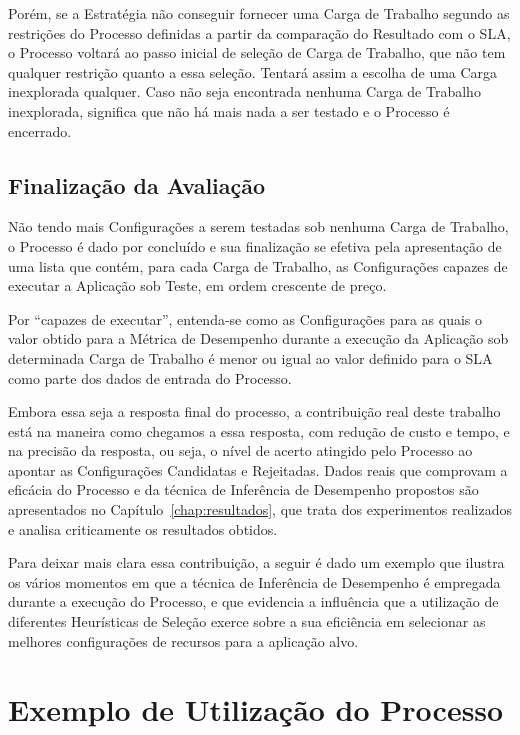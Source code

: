 Porém, se a Estratégia não conseguir fornecer uma Carga de Trabalho segundo as 
restrições do Processo definidas a partir da comparação do Resultado com o SLA, o Processo 
voltará ao passo inicial de seleção de Carga de Trabalho, que não tem qualquer 
restrição quanto a essa seleção. Tentará assim a escolha de uma Carga inexplorada
qualquer. Caso não seja encontrada nenhuma Carga de Trabalho inexplorada, significa
que não há mais nada a ser testado e o Processo é encerrado.

\subsection{Finalização da Avaliação}
Não tendo mais Configurações a serem testadas sob nenhuma Carga de Trabalho, o 
Processo é dado por concluído e sua finalização se efetiva pela apresentação de uma
lista que contém, para cada Carga de Trabalho, as Configurações capazes de executar
a Aplicação sob Teste, em ordem crescente de preço.

Por ``capazes de executar'', entenda-se como as Configurações para as quais o valor
obtido para a Métrica de Desempenho durante a execução da Aplicação sob determinada
Carga de Trabalho é menor ou igual ao valor definido para o SLA
como parte dos dados de entrada do Processo.

Embora essa seja a resposta final do processo, a contribuição real deste trabalho está
na maneira como chegamos a essa resposta, com redução de custo e tempo, e na precisão 
da resposta, ou seja, o nível de acerto atingido pelo Processo ao apontar as Configurações
Candidatas e Rejeitadas. Dados reais que comprovam a eficácia do 
Processo e da técnica de Inferência de Desempenho propostos são apresentados no
Capítulo~\ref{chap:resultados}, que trata dos experimentos realizados e analisa criticamente os resultados obtidos.

Para deixar mais clara essa contribuição, a seguir é dado um exemplo que ilustra os vários momentos
em que a técnica de Inferência de Desempenho é empregada durante a execução do Processo, e que evidencia a influência que a utilização de diferentes Heurísticas de Seleção exerce sobre a sua eficiência em selecionar as melhores configurações de recursos para a aplicação alvo.

\section{Exemplo de Utilização do Processo}

